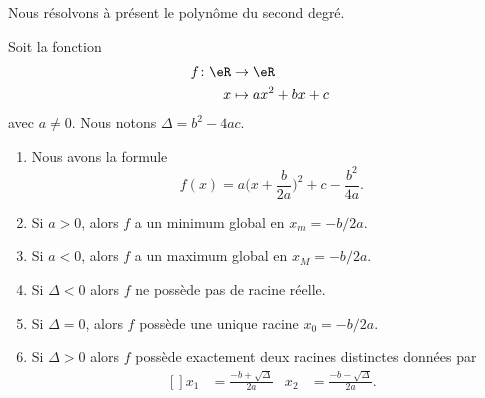 Nous résolvons à présent le polynôme du second degré.
\begin{proposition}       \label{PROPooEZIKooKjJroH}
	Soit la fonction
	\begin{equation}
		\begin{aligned}
			f\colon \eR & \to \eR           \\
			x           & \mapsto ax^2+bx+c
		\end{aligned}
	\end{equation}
	avec \( a\neq 0\). Nous notons \( \Delta=b^2-4ac\).

	\begin{enumerate}
		\item       \label{ITEMooMKUSooWwNTba}
		      Nous avons la formule
		      \begin{equation}        \label{EQooFKPOooAbIhCx}
			      f(x)=a\big( x+\frac{ b }{ 2a } \big)^2+c-\frac{ b^2 }{ 4a }.
		      \end{equation}
		\item       \label{ITEMooHQTBooZuaPAs}
		      Si \( a>0\), alors \( f\) a un minimum global en \( x_m=-b/2a\).
		\item       \label{ITEMooQMXVooWsqiXz}
		      Si \( a<0\), alors \( f\) a un maximum global en \( x_M=-b/2a\).
		\item       \label{ITEMooMAMHooNWZVQI}
		      Si \( \Delta<0\) alors \( f\) ne possède pas de racine réelle.
		\item       \label{ITEMooKUUJooTsIHhI}
		      Si \( \Delta=0\), alors \( f\) possède une unique racine \( x_0=-b/2a\).
		\item       \label{ITEMooQZGFooEGhMkX}
		      Si \( \Delta>0\) alors \( f\) possède exactement deux racines distinctes données par
		      \begin{equation}        \label{EQooGHDPooVkqINr}
			      \begin{aligned}[]
				      x_1 & =\frac{ -b+\sqrt{ \Delta } }{ 2a } & x_2 & =\frac{ -b-\sqrt{ \Delta } }{ 2a }.
			      \end{aligned}
		      \end{equation}
	\end{enumerate}
\end{proposition}

